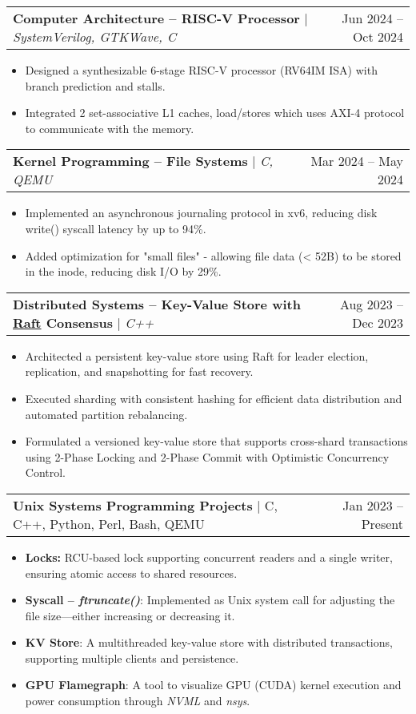 \documentclass[letterpaper,11pt]{article}
\makeatletter
\newcommand{\resumeItem}[1]{
  \item\small{
    {#1 \vspace{-2pt}}
  }
}
\newcommand{\resumeProjectHeading}[2]{
    \item
    \begin{tabular*}{1.001\textwidth}{l@{\extracolsep{\fill}}r}
      \small#1 & \small #2\\
    \end{tabular*}\vspace{-7pt}
}
\newcommand{\resumeItemListStart}{\begin{itemize}}
\newcommand{\resumeItemListEnd}{\end{itemize}\vspace{-5pt}}
\makeatother
\begin{document}
\resumeProjectHeading
{\textbf{\normalsize{Computer Architecture -- RISC-V Processor}} $|$ \emph{SystemVerilog, GTKWave, C}}{Jun 2024 -- Oct 2024}
\resumeItemListStart
\resumeItem{Designed a synthesizable 6-stage RISC-V processor (RV64IM ISA) with branch prediction and stalls.}
\resumeItem{Integrated 2 set-associative L1 caches, load/stores which uses AXI-4 protocol to communicate with the memory.}
\resumeItemListEnd
\vspace{-17pt}

\resumeProjectHeading
{\textbf{\normalsize{Kernel Programming -- File Systems}} $|$ \emph{C, QEMU}}{Mar 2024 -- May 2024}
\resumeItemListStart
\resumeItem{
  Implemented an asynchronous journaling protocol in xv6, reducing disk write() syscall latency by up to 94\%.
}
\resumeItem{
  Added optimization for "small files" - allowing file data (\textless{} 52B) to be stored in the inode, reducing disk I/O by 29\%.
}

\resumeItemListEnd
\vspace{-17pt}

\resumeProjectHeading
{\textbf{\normalsize{Distributed Systems -- Key-Value Store with \href{https://raft.github.io/raft.pdf}{Raft} Consensus}} $|$ \emph{C++}}{Aug 2023 -- Dec 2023}
\resumeItemListStart
\resumeItem{Architected a persistent key-value store using Raft for leader election, replication, and snapshotting for fast recovery.}
\resumeItem{Executed sharding with consistent hashing for efficient data distribution and automated partition rebalancing.}
\resumeItem{Formulated a versioned key-value store that supports cross-shard transactions using 2-Phase Locking and 2-Phase Commit
  with Optimistic Concurrency Control.}
\resumeItemListEnd
\vspace{-17pt}

\resumeProjectHeading
{\textbf{\normalsize{Unix Systems Programming Projects}} $|$ C, C++, Python, Perl, Bash, QEMU}{Jan 2023 -- Present}
\resumeItemListStart
\resumeItem{\textbf{Locks:} RCU-based lock supporting concurrent readers and a single writer, ensuring atomic access to shared resources.}
\resumeItem{
  \textbf{Syscall -- \textit{ftruncate()}}: Implemented as Unix system call for adjusting the file size—either increasing or decreasing it.
}
\resumeItem{\textbf{KV Store}: A multithreaded key-value store with distributed transactions, supporting multiple clients and persistence.}
\resumeItem{\textbf{GPU Flamegraph}: A tool to visualize GPU (CUDA) kernel execution and power consumption through \textit{NVML} and \textit{nsys}.}
\resumeItemListEnd
\vspace{-17pt}
\end{document}
